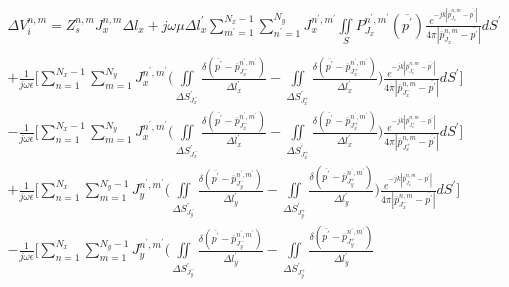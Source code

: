 \documentclass[
	12pt,				%
	openright,			%
	oneside,			%
	a4paper,			%
	english,			%
	brazil				%
	]{abntex2}
\begin{document}
\begin{apendicesenv}
\begin{figure}[htb]
\end{figure}
\begin{equation}\label{DVnmPotencialScalarPulse2Delta}
\begin{aligned}
      \Delta V_i^{n,m}=Z_s^{n,m}  J_{x}^{n,m} {\Delta l}_x
      +
    j\omega \mu   {\Delta l}^{{'}}_x \sum_{m^{'}=1}^{N_x-1}\sum_{n^{'}=1}^{N_y} J_{x}^{n^{'},m^{'}} \iint\limits_{S}  P_{J_x}^{n^{'},m^{'}}(\overline{p^{'}})   \frac{e^{-j k |\overline{p}_{{J_x}}^{n,m}-\overline{p^{'}}|}}{4 \pi |\overline{p}_{{J_x}}^{n,m}-\overline{p^{'}}|} dS^{'}    \\ \\
    +
    \frac{1}{j\omega \epsilon}\biggl[ \sum_{n=1}^{N_x-1}\sum_{m=1}^{N_y}J_{x}^{n^{'},m^{'}} 
\biggl(\iint \limits_{{\Delta S}^{'}_{J_x^-}}  \frac{ \delta(\overline{p^{'}}-\overline{p}^{n^{'},m^{'}}_{J_x^{-}})}{\Delta l^{'}_x } 
- \iint \limits_{{\Delta S}^{'}_{J_x^{+}}}  \frac{ \delta(\overline{p^{'}}-\overline{p}^{n^{'},m^{'}}_{J_x^{+}})}{\Delta l^{'}_x } 
\biggl)
\frac{e^{-j k |\overline{p}_{{J_x^{-}}}^{n,m}-\overline{p^{'}}|}}{4 \pi |\overline{p}_{{J_x^{-}}}^{n,m}-\overline{p^{'}}|} dS^{'}  \biggl] \\
    -
      \frac{1}{j\omega \epsilon}\biggl[ \sum_{n=1}^{N_x-1}\sum_{m=1}^{N_y}J_{x}^{n^{'},m^{'}} 
\biggl(\iint \limits_{{\Delta S}^{'}_{J_x^-}}  \frac{ \delta(\overline{p^{'}}-\overline{p}^{n^{'},m^{'}}_{J_x^{-}})}{\Delta l^{'}_x } 
- \iint \limits_{{\Delta S}^{'}_{J_x^{+}}}  \frac{ \delta(\overline{p^{'}}-\overline{p}^{n^{'},m^{'}}_{J_x^{+}})}{\Delta l^{'}_x } 
\biggl)
\frac{e^{-j k |\overline{p}_{{J_x^{+}}}^{n,m}-\overline{p^{'}}|}}{4 \pi |\overline{p}_{{J_x^{+}}}^{n,m}-\overline{p^{'}}|}dS^{'}  \biggl] \\
    +
    \frac{1}{j\omega \epsilon}\biggl[ \sum_{n=1}^{N_x}\sum_{m=1}^{N_y-1}J_{y}^{n^{'},m^{'}} 
\biggl(\iint \limits_{{\Delta S}^{'}_{J_y^-}}  \frac{ \delta(\overline{p^{'}}-\overline{p}^{n^{'},m^{'}}_{J_y^{-}})}{\Delta l^{'}_y } 
- \iint \limits_{{\Delta S}^{'}_{J_y^{+}}}  \frac{ \delta(\overline{p^{'}}-\overline{p}^{n^{'},m^{'}}_{J_y^{+}})}{\Delta l^{'}_y } 
\biggl)
\frac{e^{-j k |\overline{p}_{{J_x^{-}}}^{n,m}-\overline{p^{'}}|}}{4 \pi |\overline{p}_{{J_x^{-}}}^{n,m}-\overline{p^{'}}|} dS^{'}  \biggl] \\
    -
      \frac{1}{j\omega \epsilon}\biggl[ \sum_{n=1}^{N_x}\sum_{m=1}^{N_y-1}J_{y}^{n^{'},m^{'}} 
\biggl(\iint \limits_{{\Delta S}^{'}_{J_y^-}}  \frac{ \delta(\overline{p^{'}}-\overline{p}^{n^{'},m^{'}}_{J_y^{-}})}{\Delta l^{'}_y } 
- \iint \limits_{{\Delta S}^{'}_{J_y^{+}}}  \frac{ \delta(\overline{p^{'}}-\overline{p}^{n^{'},m^{'}}_{J_y^{+}})}{\Delta l^{'}_y } 

\end{aligned}
\end{equation}
\end{apendicesenv}
\end{document}
